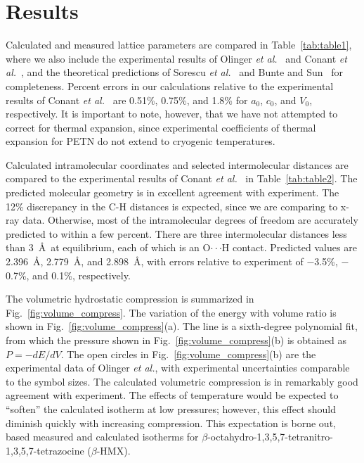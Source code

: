 \documentclass[prb,aps,nobibnotes,twocolumn,doublespace,twocolumngrid,superbib]{revtex4}
\begin{document}
\section{Results}
\label{sec:results}
Calculated and measured lattice parameters are compared in
Table~\ref{tab:table1}, where we also include the experimental results
of Olinger {\it et al.}~\cite{Olinger_1975v62} and Conant {\it et
al.}~\cite{Conant_1979}, and the theoretical predictions of Sorescu
{\it et al.}~\cite{Sorescu_1999v103} and Bunte and
Sun~\cite{Bunte_2000v104} for completeness.  Percent errors in our
calculations relative to the experimental results of Conant {\it et
al.}~\cite{Conant_1979} are 0.51\%, 0.75\%, and 1.8\% for $a_0$,
$c_0$, and $V_0$, respectively.  It is important to note, however,
that we have not attempted to correct for thermal expansion, since
experimental coefficients of thermal expansion for PETN do not extend
to cryogenic temperatures.

Calculated intramolecular coordinates and selected intermolecular
distances are compared to the experimental results of Conant {\it et
al.}~\cite{Conant_1979} in Table~\ref{tab:table2}.  The predicted
molecular geometry is in excellent agreement with experiment.  The
12\% discrepancy in the C-H distances is expected, since we are
comparing to x-ray data.  Otherwise, most of the intramolecular
degrees of freedom are accurately predicted to within a few percent.
There are three intermolecular distances less than 3~\AA\ at
equilibrium, each of which is an O$\cdot\cdot\cdot$H contact.
Predicted values are 2.396~\AA, 2.779~\AA, and 2.898~\AA, with errors
relative to experiment of $-$3.5\%, $-$0.7\%, and 0.1\%, respectively.

The volumetric hydrostatic compression is summarized in
Fig.~\ref{fig:volume_compress}.  The variation of the energy with
volume ratio is shown in Fig.~\ref{fig:volume_compress}(a).  The line
is a sixth-degree polynomial fit, from which the pressure shown in
Fig.~\ref{fig:volume_compress}(b) is obtained as $P=-dE/dV$.  The open
circles in Fig.~\ref{fig:volume_compress}(b) are the experimental data
of Olinger {\it et al.}, with experimental uncertainties comparable to
the symbol sizes.  The calculated volumetric compression is in
remarkably good agreement with experiment.  The effects of temperature
would be expected to ``soften'' the calculated isotherm at low
pressures; however, this effect should diminish quickly with
increasing compression. This expectation is borne out, based measured 
and calculated isotherms for 
$\beta$-octahydro-1,3,5,7-tetranitro-1,3,5,7-tetrazocine
($\beta$-HMX).\cite{Gump_2003,Sewell03_unpublished}
\end{document}
